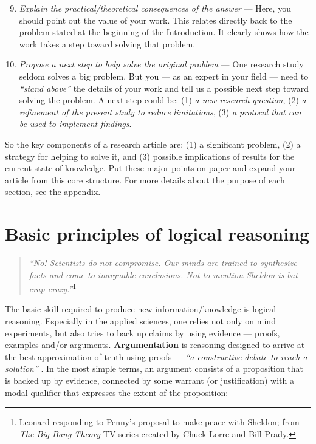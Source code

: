 \documentclass[graybox,envcountchap,sectrefs,UStrade]{svmono}
\begin{document}
\begin{description}
      \begin{enumerate}
      \setcounter{enumi}{8}
      \item \emph{Explain the practical/theoretical consequences of the answer} --- Here, you should point out the value of your work. This relates directly back to the problem stated at the beginning of the Introduction. It clearly shows how the work takes a step toward solving that problem.
      \item \emph{Propose a next step to help solve the original problem} --- One research study seldom solves a big problem. But you --- as an expert in your field --- need to \emph{``stand above''} the details of your work and tell us a possible next step toward solving the problem. A next step could be: (1) \emph{a new research question}, (2) \emph{a refinement of the present study to reduce limitations}, (3) \emph{a protocol that can be used to implement findings}.
      \end{enumerate}
\end{description}

So the key components of a research article are: (1) a significant problem, (2) a strategy for helping to solve it, and (3) possible implications of results for the current state of knowledge. Put these major points on paper and expand your article from this core structure. For more details about the purpose of each section, see the appendix. \par


\section{Basic principles of logical reasoning}

\begin{quote}
    \emph{``No! Scientists do not compromise. Our minds are trained to synthesize facts and come to inarguable conclusions. Not to mention Sheldon is bat-crap crazy.''}\footnote{Leonard responding to Penny's proposal to make peace with Sheldon; from \emph{The Big Bang Theory} TV series created by Chuck Lorre and Bill Prady.}
\end{quote}

The basic skill required to produce new information/knowledge is logical reasoning. Especially in the applied sciences, one relies not only on mind experiments, but also tries to back up claims by using evidence --- proofs, examples and/or arguments. \textbf{Argumentation} is reasoning designed to arrive at the best approximation of truth using proofs --- \emph{``a constructive debate to reach a solution''} \citep{Rossiter2010RCS}. In the most simple terms, an argument consists of a proposition that is backed up by evidence, connected by some warrant (or justification) with a modal qualifier that expresses the extent of the proposition:
\end{document}
